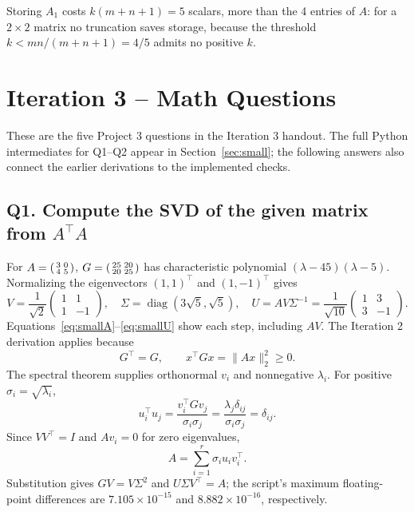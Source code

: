 \documentclass[11pt,letterpaper]{article}
\numberwithin{equation}{section}
\newcommand{\diag}{\operatorname{diag}}
\begin{document}
Storing $A_1$ costs $k(m+n+1)=5$ scalars, more than the 4 entries of $A$: for a $2\times2$ matrix no truncation saves storage, because the threshold $k<mn/(m+n+1)=4/5$ admits no positive $k$.

\section{Iteration 3 -- Math Questions}\label{sec:math}
These are the five Project 3 questions in the Iteration 3 handout. The full Python intermediates for Q1--Q2 appear in Section~\ref{sec:small}; the following answers also connect the earlier derivations to the implemented checks.

\subsection*{Q1. Compute the SVD of the given matrix from \(A^\top A\)}
For $A=\begin{psmallmatrix}3&0\\4&5\end{psmallmatrix}$, $G=\begin{psmallmatrix}25&20\\20&25\end{psmallmatrix}$ has characteristic polynomial $(\lambda-45)(\lambda-5)$. Normalizing the eigenvectors $(1,1)^\top$ and $(1,-1)^\top$ gives
\[
V=\frac1{\sqrt2}\begin{pmatrix}1&1\\1&-1\end{pmatrix},\quad
\Sigma=\diag(3\sqrt5,\sqrt5),\quad
U=AV\Sigma^{-1}=\frac1{\sqrt{10}}\begin{pmatrix}1&3\\3&-1\end{pmatrix}.
\]
Equations~\eqref{eq:smallA}--\eqref{eq:smallU} show each step, including $AV$. The Iteration 2 derivation applies because
\begin{equation}\label{eq:psd}
G^\top=G,\qquad x^\top Gx=\|Ax\|_2^2\ge0.
\end{equation}
The spectral theorem supplies orthonormal $v_i$ and nonnegative $\lambda_i$. For positive $\sigma_i=\sqrt{\lambda_i}$,
\begin{equation}\label{eq:uorth}
u_i^\top u_j=\frac{v_i^\top Gv_j}{\sigma_i\sigma_j}
=\frac{\lambda_j\delta_{ij}}{\sigma_i\sigma_j}=\delta_{ij}.
\end{equation}
Since $VV^\top=I$ and $Av_i=0$ for zero eigenvalues,
\begin{equation}\label{eq:expansion}
A=\sum_{i=1}^{r}\sigma_i u_i v_i^\top .
\end{equation}
Substitution gives $GV=V\Sigma^2$ and $U\Sigma V^\top=A$; the script's maximum floating-point differences are $7.105\times10^{-15}$ and $8.882\times10^{-16}$, respectively.
\end{document}
